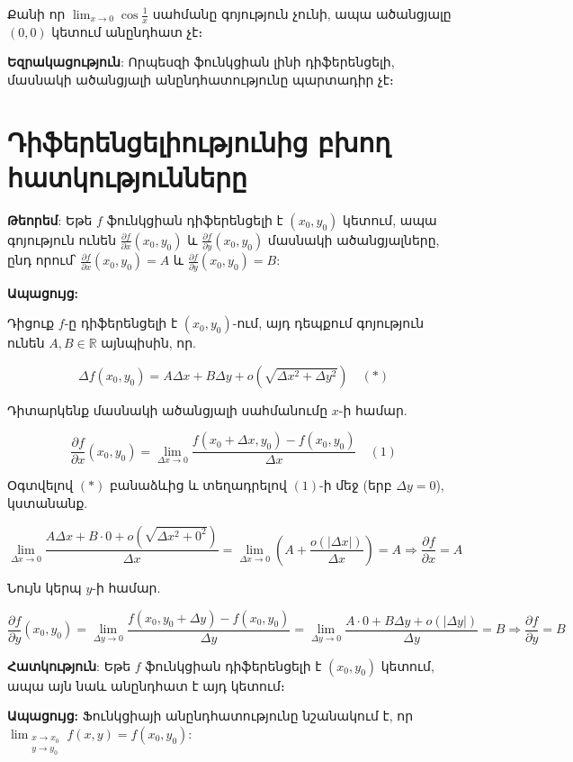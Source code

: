 \documentclass[12pt, a4paper]{article}
\begin{document}
Քանի որ $\lim_{x \to 0} \cos \frac{1}{x}$ սահմանը գոյություն չունի, ապա ածանցյալը $(0, 0)$ կետում անընդհատ չէ։

\textbf{Եզրակացություն}: Որպեսզի ֆունկցիան լինի դիֆերենցելի, մասնակի ածանցյալի անընդհատությունը պարտադիր չէ։

\section{Դիֆերենցելիությունից բխող հատկությունները}

\textbf{Թեորեմ}: Եթե $f$ ֆունկցիան դիֆերենցելի է $(x_0, y_0)$ կետում, ապա գոյություն ունեն $\frac{\partial f}{\partial x}(x_0, y_0)$ և $\frac{\partial f}{\partial y}(x_0, y_0)$ մասնակի ածանցյալները, ընդ որում՝ $\frac{\partial f}{\partial x}(x_0, y_0) = A$ և $\frac{\partial f}{\partial y}(x_0, y_0) = B$:

\textbf{Ապացույց:}

Դիցուք $f$-ը դիֆերենցելի է $(x_0, y_0)$-ում, այդ դեպքում գոյություն ունեն $A, B \in \mathbb{R}$ այնպիսին, որ.

$$\Delta f(x_0, y_0) = A \Delta x + B \Delta y + o(\sqrt{\Delta x^2 + \Delta y^2}) \quad (*)$$

Դիտարկենք մասնակի ածանցյալի սահմանումը $x$-ի համար.

$$\frac{\partial f}{\partial x}(x_0, y_0) = \lim_{\Delta x \to 0} \frac{f(x_0 + \Delta x, y_0) - f(x_0, y_0)}{\Delta x} \quad (1)$$

Օգտվելով $(*)$ բանաձևից և տեղադրելով $(1)$-ի մեջ (երբ $\Delta y = 0$), կստանանք.

$$\lim_{\Delta x \to 0} \frac{A \Delta x + B \cdot 0 + o(\sqrt{\Delta x^2 + 0^2})}{\Delta x} = \lim_{\Delta x \to 0} \left( A + \frac{o(|\Delta x|)}{\Delta x} \right) = A \Rightarrow \frac{\partial f}{\partial x} = A$$

Նույն կերպ $y$-ի համար.

$$\frac{\partial f}{\partial y}(x_0, y_0) = \lim_{\Delta y \to 0} \frac{f(x_0, y_0 + \Delta y) - f(x_0, y_0)}{\Delta y} = \lim_{\Delta y \to 0} \frac{A \cdot 0 + B \Delta y + o(|\Delta y|)}{\Delta y} = B \Rightarrow \frac{\partial f}{\partial y} = B$$

\textbf{Հատկություն}: Եթե $f$ ֆունկցիան դիֆերենցելի է $(x_0, y_0)$ կետում, ապա այն նաև անընդհատ է այդ կետում։

\textbf{Ապացույց:}
Ֆունկցիայի անընդհատությունը նշանակում է, որ $\lim_{\substack{x \to x_0 \\ y \to y_0}} f(x, y) = f(x_0, y_0)$:
\end{document}
